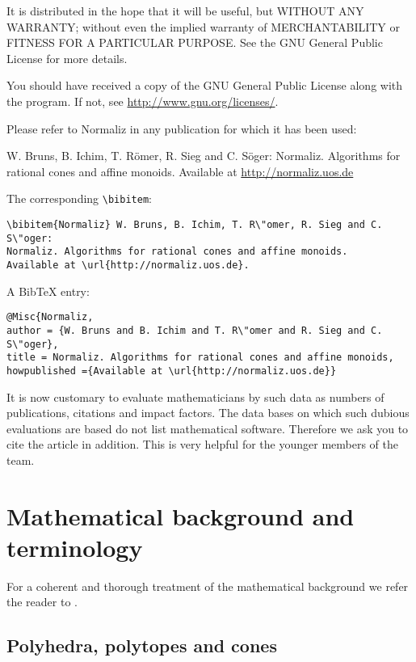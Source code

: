 \documentclass[12pt,a4paper]{scrartcl}
\theoremstyle{definition}
\begin{document}
It is distributed in the hope that it will be useful, but
WITHOUT ANY WARRANTY; without even the implied warranty of
MERCHANTABILITY or FITNESS FOR A PARTICULAR PURPOSE. See the
GNU General Public License for more details.

You should have received a copy of the GNU General Public
License along with the program. If not, see
\url{http://www.gnu.org/licenses/}.

Please refer to Normaliz in any publication for which it has
been used:
\begin{center}
	W. Bruns, B. Ichim, T. R\"omer, R. Sieg and C. S\"oger: Normaliz. Algorithms for
	rational cones and affine monoids. Available at
	\url{http://normaliz.uos.de}
\end{center}
The corresponding \verb|\bibitem|:
\begin{Verbatim}
\bibitem{Normaliz} W. Bruns, B. Ichim, T. R\"omer, R. Sieg and C. S\"oger:
Normaliz. Algorithms for rational cones and affine monoids.
Available at \url{http://normaliz.uos.de}.
\end{Verbatim}

A BibTeX entry:
\begin{Verbatim}
@Misc{Normaliz,
author = {W. Bruns and B. Ichim and T. R\"omer and R. Sieg and C. S\"oger},
title = Normaliz. Algorithms for rational cones and affine monoids,
howpublished ={Available at \url{http://normaliz.uos.de}}
\end{Verbatim}

It is now customary to evaluate mathematicians by such data as
numbers of publications, citations and impact factors. The data
bases on which such dubious evaluations are based do not list
mathematical software. Therefore we ask you to cite the article
\cite{BIS} in addition. This is very helpful for the younger
members of the team.

\newpage

\appendix

\section{Mathematical background and terminology}

For a coherent and thorough treatment of the mathematical background we refer the reader to \cite{BG}.

\subsection{Polyhedra, polytopes and cones}
\end{document}
